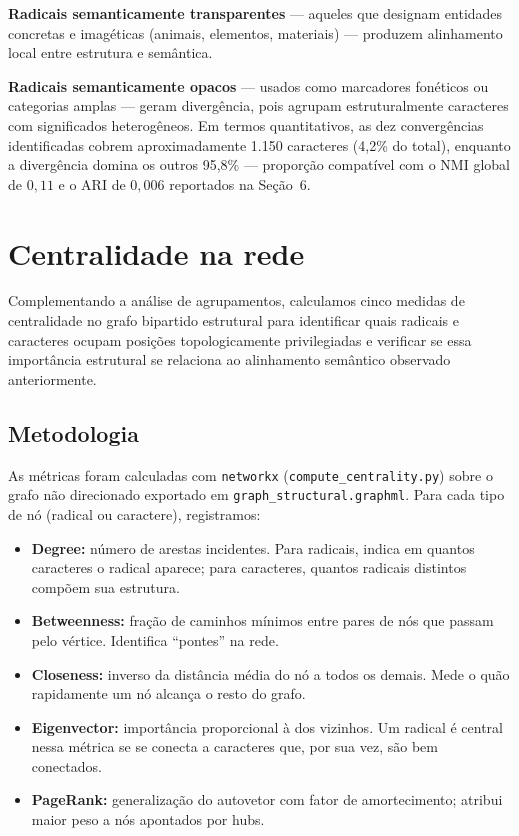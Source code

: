 \documentclass[10pt, a4paper, titlepage]{extarticle}
\begin{document}
\textbf{Radicais semanticamente transparentes} ---
aqueles que designam entidades concretas e imagéticas (animais, elementos,
materiais) --- produzem alinhamento local entre estrutura e semântica.

\textbf{Radicais semanticamente opacos} --- usados como marcadores
fonéticos ou categorias amplas --- geram divergência, pois agrupam
estruturalmente caracteres com significados heterogêneos.
Em termos quantitativos, as dez convergências identificadas cobrem
aproximadamente 1.150 caracteres (4,2\% do total), enquanto a divergência
domina os outros 95,8\% --- proporção compatível com o NMI global de
$0{,}11$ e o ARI de $0{,}006$ reportados na Seção~6.

\section{Centralidade na rede}
Complementando a análise de agrupamentos, calculamos cinco medidas de centralidade no grafo bipartido estrutural para identificar quais radicais e caracteres ocupam posições topologicamente privilegiadas
e verificar se essa importância estrutural se relaciona ao alinhamento semântico observado anteriormente.

\subsection{Metodologia}
As métricas foram calculadas com \texttt{networkx} (\texttt{compute\_centrality.py}) sobre o grafo não direcionado exportado em \texttt{graph\_structural.graphml}. Para cada tipo de nó (radical ou caractere), registramos:

\begin{itemize}
    \item \textbf{Degree:} número de arestas incidentes. Para radicais, indica em quantos caracteres o radical aparece; para caracteres, quantos radicais distintos compõem sua estrutura.
    \item \textbf{Betweenness:} fração de caminhos mínimos entre pares de nós que passam pelo vértice. Identifica ``pontes'' na rede.
    \item \textbf{Closeness:} inverso da distância média do nó a todos os demais. Mede o quão rapidamente um nó alcança o resto do grafo.
    \item \textbf{Eigenvector:} importância proporcional à dos vizinhos. Um radical é central nessa métrica se se conecta a caracteres que, por sua vez, são bem conectados.
    \item \textbf{PageRank:} generalização do autovetor com fator de amortecimento; atribui maior peso a nós apontados por hubs.
\end{itemize}
\end{document}
